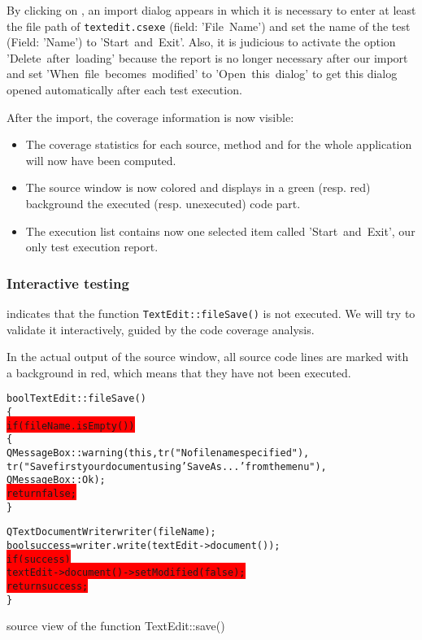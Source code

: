 By clicking on , 
an import dialog appears in which it is necessary to enter at least  the file path of
\verb$textedit.csexe$ (field: 'File~Name') and set  the name of the test (Field: 'Name') to
'\textsf{Start~and~Exit}'.  Also, it is judicious to activate the option
'Delete~after~loading' because the report is no longer necessary after our
import and set 'When~file~becomes~modified' to 'Open~this~dialog' to get this
dialog opened automatically after each test execution.

After the import, the coverage information is now visible:
\begin{itemize}
  \item The coverage statistics for each source, method and for the whole
    application will now have been computed.
  \item The source window is now colored and displays in a green (resp.
    red) background the executed (resp. unexecuted) code part.
  \item The execution list contains now one selected item called
    '\textsf{Start~and~Exit}', our only test execution report.
\end{itemize}

\subsubsection{Interactive testing}

{\CoverageBrowser} indicates that the function \verb$TextEdit::fileSave()$ is not executed.
We will try to validate it interactively, guided by the code coverage analysis.

In the actual output of the source window, all source code lines are marked
with a background in red, which means that they have not been executed. 

    \begin{figureenv}
  \scriptsize
\begin{alltt}
bool TextEdit::fileSave()
\{
\colorbox{red}{  if (fileName.isEmpty())}
  \{
    QMessageBox::warning(this,tr("No file name specified"),
      tr("Save first your document using 'Save As...' from the menu"),
      QMessageBox::Ok );
\colorbox{red}{    return false;}
   \}

  QTextDocumentWriter writer(fileName);
  bool success = writer.write(textEdit->document());
\colorbox{red}{  if (success)}
\colorbox{red}{     textEdit->document()->setModified(false);}
\colorbox{red}{  return success;}
\}
\end{alltt}
\caption{{\CoverageBrowser} source view of the function TextEdit::save()}
\label{lst:src1}
\end{figureenv}

